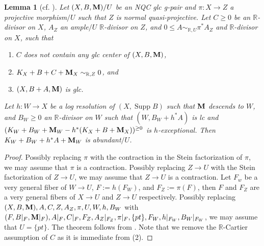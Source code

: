 \documentclass[11pt]{amsart}
\numberwithin{equation}{section}
\newcommand{\Mm}{{\bf{M}}}
\newcommand{\Rr}{\mathbb{R}}
\newcommand{\Supp}{\operatorname{Supp}}
\newtheorem{lem}[thm]{Lemma}
\theoremstyle{definition}
\theoremstyle{definition}
\theoremstyle{definition}
\begin{document}
\begin{lem}[{cf. \cite[Lemma 3.6]{Has20b}}]\label{lem: has20b 3.6 rel ver}
Let $(X,B,\Mm)/U$ be an NQC glc g-pair and $\pi: X\rightarrow Z$ a projective morphism$/U$ such that $Z$ is normal quasi-projective. Let $C\geq 0$ be an $\Rr$-divisor on $X$, $A_Z$ an ample$/U$ $\Rr$-divisor on $Z$, and $0\leq A\sim_{\Rr,U}\pi^*A_Z$ and $\Rr$-divisor on $X$, such that
\begin{enumerate}
    \item $C$ does not contain any glc center of $(X,B,\Mm)$,
    \item $K_X+B+C+\Mm_X\sim_{\Rr,Z}0$, and
    \item $(X,B+A,\Mm)$ is glc.
\end{enumerate}
Let $h: W\rightarrow X$ be a log resolution of $(X,\Supp B)$ such that $\Mm$ descends to $W$, and $B_W\geq 0$ an $\Rr$-divisor on $W$ such that $(W,B_W+h^*A)$ is lc and $(K_W+B_W+\Mm_W-h^*(K_X+B+\Mm_X))^{\geq 0}$ is $h$-exceptional. Then $K_W+B_W+h^*A+\Mm_W$ is abundant$/U$. 
\end{lem}
\begin{proof}
Possibly replacing $\pi$ with the contraction in the Stein factorization of $\pi$, we may assume that $\pi$ is a contraction. Possibly replacing $Z\rightarrow U$ with the Stein factorization of $Z\rightarrow U$, we may assume that $Z\rightarrow U$ is a contraction. Let $F_w$ be a very general fiber of $W\rightarrow U$, $F:=h(F_W)$, and $F_Z:=\pi(F)$, then $F$ and $F_Z$ are a very general fibers of $X\rightarrow U$ and $Z\rightarrow U$ respectively. Possibly replacing $(X,B,\Mm),A,C,Z,A_Z,\pi,U,W,h,B_W$ with $(F,B|_F,\Mm|_F),A|_F,C|_F,F_Z,A_Z|_{F_Z},\pi|_F,\{pt\},F_W,h|_{F_W},B_W|_{F_W}$, we may assume that $U=\{pt\}$. The theorem follows from \cite[Theorem 3.5, Lemma 3.6]{Has20b}. Note that we remove the $\Rr$-Cartier assumption of $C$ as it is immediate from (2).
\end{proof}
\end{document}
